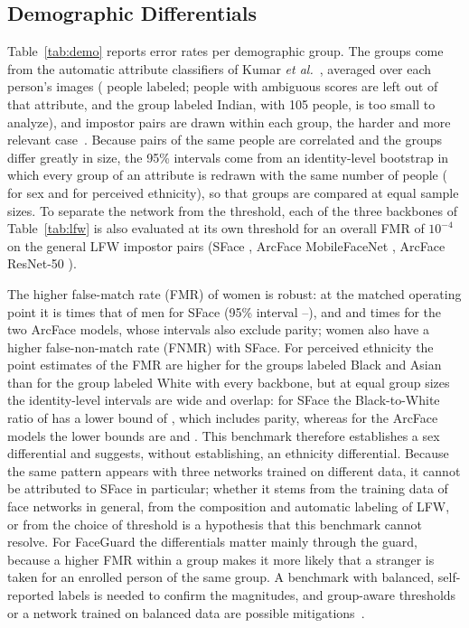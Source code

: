 \documentclass[journal]{IEEEtran}
\newcommand{\sys}{FaceGuard}
\begin{document}
\subsection{Demographic Differentials}\label{sec:demo}
Table~\ref{tab:demo} reports error rates per demographic group. The groups come from the automatic attribute classifiers of Kumar \emph{et al.}~\cite{kumar2011attributes}, averaged over each person's images (\dmLabeled{} people labeled; people with ambiguous scores are left out of that attribute, and the group labeled Indian, with 105 people, is too small to analyze), and impostor pairs are drawn within each group, the harder and more relevant case~\cite{drozdowski2020bias}. Because pairs of the same people are correlated and the groups differ greatly in size, the 95\% intervals come from an identity-level bootstrap in which every group of an attribute is redrawn with the same number of people (\dbBalSex{} for sex and \dbBalEth{} for perceived ethnicity), so that groups are compared at equal sample sizes. To separate the network from the threshold, each of the three backbones of Table~\ref{tab:lfw} is also evaluated at its own threshold for an overall FMR of $10^{-4}$ on the general LFW impostor pairs (SFace \dbSfThr, ArcFace MobileFaceNet \dbMbfThr, ArcFace ResNet-50 \dbRfThr).

The higher false-match rate (FMR) of women is robust: at the matched operating point it is \dbSfFemaleRatio{} times that of men for SFace (95\% interval \dbSfFemaleRatioLo--\dbSfFemaleRatioHi), and \dbMbfFemaleRatio{} and \dbRfFemaleRatio{} times for the two ArcFace models, whose intervals also exclude parity; women also have a higher false-non-match rate (FNMR) with SFace. For perceived ethnicity the point estimates of the FMR are higher for the groups labeled Black and Asian than for the group labeled White with every backbone, but at equal group sizes the identity-level intervals are wide and overlap: for SFace the Black-to-White ratio of \dbSfBlackRatio{} has a lower bound of \dbSfBlackRatioLo, which includes parity, whereas for the ArcFace models the lower bounds are \dbMbfBlackRatioLo{} and \dbRfBlackRatioLo. This benchmark therefore establishes a sex differential and suggests, without establishing, an ethnicity differential. Because the same pattern appears with three networks trained on different data, it cannot be attributed to SFace in particular; whether it stems from the training data of face networks in general, from the composition and automatic labeling of LFW, or from the choice of threshold is a hypothesis that this benchmark cannot resolve. For \sys{} the differentials matter mainly through the guard, because a higher FMR within a group makes it more likely that a stranger is taken for an enrolled person of the same group. A benchmark with balanced, self-reported labels is needed to confirm the magnitudes, and group-aware thresholds or a network trained on balanced data are possible mitigations~\cite{drozdowski2020bias}.
\end{document}
